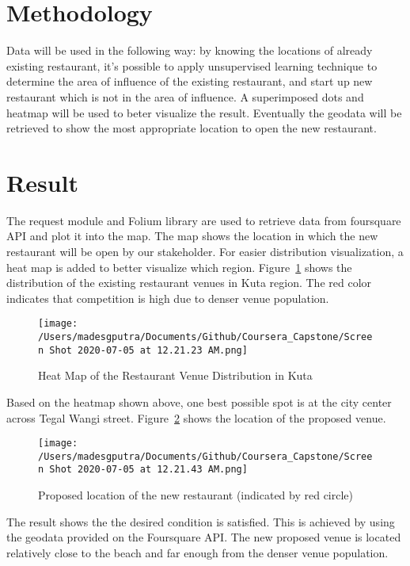 \documentclass[12pt,letterpaper]{article}
\begin{document}
\section{Methodology}
Data will be used in the following way: by knowing the locations of already existing restaurant, it's possible to apply unsupervised learning  technique to determine the area of influence of the existing restaurant, and start up new restaurant which is not in the area of influence. A superimposed dots and heatmap will be used to beter visualize the result. Eventually the geodata will be retrieved to show the most appropriate location to open the new restaurant. 

\section{Result}
The request module and Folium library are used to retrieve data from foursquare API and plot it into the map. The map shows the location in which the new restaurant will be open by our stakeholder. For easier distribution visualization, a heat map is added to better visualize which region.  Figure~\ref{fig:heatmap1} shows the distribution of the existing restaurant venues in Kuta region. The red color indicates that competition is high due to denser venue population. 
\begin{figure}[H]
	\centering
	\texttt{[image: /Users/madesgputra/Documents/Github/Coursera\_Capstone/Screen Shot 2020-07-05 at 12.21.23 AM.png]} 
	\caption[Heat Map of the Restaurant Venue Distribution in Kuta]{Heat Map of the Restaurant Venue Distribution in Kuta}
	\label{fig:heatmap1}
\end{figure}
Based on the heatmap shown above, one best possible spot is at the city center across Tegal Wangi street. Figure~\ref{fig:heatmap2} shows the location of the proposed venue. 
\begin{figure}[H]
	\centering
	\texttt{[image: /Users/madesgputra/Documents/Github/Coursera\_Capstone/Screen Shot 2020-07-05 at 12.21.43 AM.png]} 
	\caption[Proposed location of the new restaurant]{Proposed location of the new restaurant (indicated by red circle)}
	\label{fig:heatmap2}
\end{figure}
The result shows the the desired condition is satisfied. This is achieved by using the geodata provided on the Foursquare API. The new proposed venue is located relatively close to the beach and far enough from the denser venue population.
\end{document}
